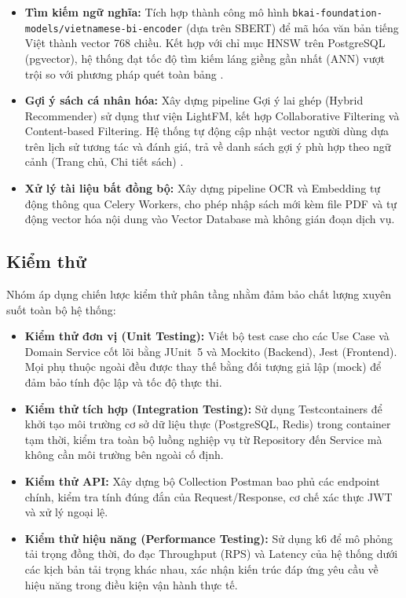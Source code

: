 \begin{itemize}
    \item \textbf{Tìm kiếm ngữ nghĩa:} Tích hợp thành công mô hình \texttt{bkai-foundation-models/vietnamese-bi-encoder} (dựa trên SBERT) để mã hóa văn bản tiếng Việt thành vector 768 chiều. Kết hợp với chỉ mục HNSW trên PostgreSQL (pgvector), hệ thống đạt tốc độ tìm kiếm láng giềng gần nhất (ANN) vượt trội so với phương pháp quét toàn bảng \cite{reimers2019sentence}.

    \item \textbf{Gợi ý sách cá nhân hóa:} Xây dựng pipeline Gợi ý lai ghép (Hybrid Recommender) sử dụng thư viện LightFM, kết hợp Collaborative Filtering và Content-based Filtering. Hệ thống tự động cập nhật vector người dùng dựa trên lịch sử tương tác và đánh giá, trả về danh sách gợi ý phù hợp theo ngữ cảnh (Trang chủ, Chi tiết sách) \cite{aggarwal2016recommender}.

    \item \textbf{Xử lý tài liệu bất đồng bộ:} Xây dựng pipeline OCR và Embedding tự động thông qua Celery Workers, cho phép nhập sách mới kèm file PDF và tự động vector hóa nội dung vào Vector Database mà không gián đoạn dịch vụ.
\end{itemize}

\subsection{Kiểm thử}

Nhóm áp dụng chiến lược kiểm thử phân tầng nhằm đảm bảo chất lượng xuyên suốt toàn bộ hệ thống:

\begin{itemize}
    \item \textbf{Kiểm thử đơn vị (Unit Testing):} Viết bộ test case cho các Use Case và Domain Service cốt lõi bằng JUnit~5 và Mockito (Backend), Jest (Frontend). Mọi phụ thuộc ngoài đều được thay thế bằng đối tượng giả lập (mock) để đảm bảo tính độc lập và tốc độ thực thi.

    \item \textbf{Kiểm thử tích hợp (Integration Testing):} Sử dụng Testcontainers để khởi tạo môi trường cơ sở dữ liệu thực (PostgreSQL, Redis) trong container tạm thời, kiểm tra toàn bộ luồng nghiệp vụ từ Repository đến Service mà không cần môi trường bên ngoài cố định.

    \item \textbf{Kiểm thử API:} Xây dựng bộ Collection Postman bao phủ các endpoint chính, kiểm tra tính đúng đắn của Request/Response, cơ chế xác thực JWT và xử lý ngoại lệ.

    \item \textbf{Kiểm thử hiệu năng (Performance Testing):} Sử dụng k6 để mô phỏng tải trọng đồng thời, đo đạc Throughput (RPS) và Latency của hệ thống dưới các kịch bản tải trọng khác nhau, xác nhận kiến trúc đáp ứng yêu cầu về hiệu năng trong điều kiện vận hành thực tế.
\end{itemize}

